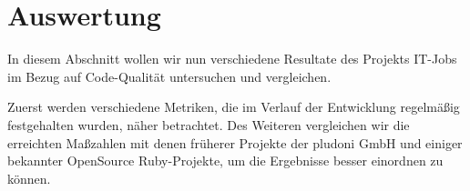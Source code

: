 \chapter{Auswertung}
\label{sec:auswertung}

In diesem Abschnitt wollen wir nun verschiedene Resultate des Projekts IT-Jobs im Bezug auf Code-Qualität untersuchen und vergleichen.

Zuerst werden verschiedene Metriken, die im Verlauf der Entwicklung regelmäßig festgehalten wurden, näher betrachtet. Des Weiteren vergleichen wir die erreichten Maßzahlen mit denen früherer Projekte der pludoni GmbH und einiger bekannter OpenSource Ruby-Projekte, um die Ergebnisse besser einordnen zu können.








